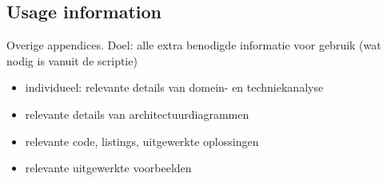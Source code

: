 
\subsection{Usage information}
Overige appendices. Doel: alle extra benodigde informatie voor gebruik (wat nodig is vanuit de scriptie)

\begin{itemize}
\item individueel: relevante details van domein- en techniekanalyse
\item relevante details van architectuurdiagrammen
\item relevante code, listings, uitgewerkte oplossingen 
\item relevante uitgewerkte voorbeelden
\end{itemize}
